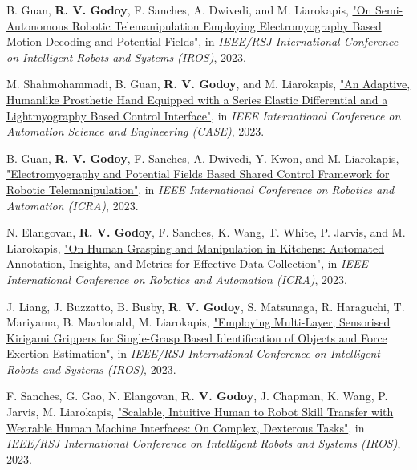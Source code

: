 \begin{cvparagraph}
B. Guan, \textbf{R. V. Godoy}, F. Sanches, A. Dwivedi, and M. Liarokapis, \href{https://www.researchgate.net/publication/372788367_On_Semi-Autonomous_Robotic_Telemanipulation_Employing_Electromyography_Based_Motion_Decoding_and_Potential_Fields}{"On Semi-Autonomous Robotic Telemanipulation Employing Electromyography Based Motion Decoding and Potential Fields"}, in \textit{IEEE/RSJ International Conference on Intelligent Robots and Systems (IROS)}, 2023.

M. Shahmohammadi, B. Guan, \textbf{R. V. Godoy}, and M. Liarokapis, \href{https://ieeexplore.ieee.org/document/10260643}{"An Adaptive, Humanlike Prosthetic Hand Equipped with a Series Elastic Differential and a Lightmyography Based Control Interface"}, in \textit{IEEE International Conference on Automation Science and Engineering (CASE)}, 2023.

B. Guan, \textbf{R. V. Godoy}, F. Sanches, A. Dwivedi, Y. Kwon, and M. Liarokapis, \href{https://www.researchgate.net/publication/370205435_Electromyography_and_Potential_Fields_Based_Shared_Control_Framework_for_Robotic_Telemanipulation}{"Electromyography and Potential Fields Based Shared Control Framework for Robotic Telemanipulation"}, in \textit{IEEE International Conference on Robotics and Automation (ICRA)}, 2023.

N. Elangovan, \textbf{R. V. Godoy}, F. Sanches, K. Wang, T. White, P. Jarvis, and M. Liarokapis, \href{https://ieeexplore.ieee.org/document/10161171}{"On Human Grasping and Manipulation in Kitchens: Automated Annotation, Insights, and Metrics for Effective Data Collection"}, in \textit{IEEE International Conference on Robotics and Automation (ICRA)}, 2023.

J. Liang, J. Buzzatto, B. Busby, \textbf{R. V. Godoy}, S. Matsunaga, R. Haraguchi, T. Mariyama, B. Macdonald, M. Liarokapis, \href{https://www.researchgate.net/publication/374086867_Employing_Multi-Layer_Sensorised_Kirigami_Grippers_for_Single-Grasp_Based_Identification_of_Objects_and_Force_Exertion_Estimation?_tp=eyJjb250ZXh0Ijp7ImZpcnN0UGFnZSI6InByb2ZpbGUiLCJwYWdlIjoicHJvZmlsZSJ9fQ}{"Employing Multi-Layer, Sensorised Kirigami Grippers for Single-Grasp Based Identification of Objects and Force Exertion Estimation"}, in \textit{IEEE/RSJ International Conference on Intelligent Robots and Systems (IROS)}, 2023. 

F. Sanches, G. Gao, N. Elangovan, \textbf{R. V. Godoy}, J. Chapman, K. Wang, P. Jarvis, M. Liarokapis, \href{https://www.researchgate.net/publication/372861764_Scalable_Intuitive_Human_to_Robot_Skill_Transfer_with_Wearable_Human_Machine_Interfaces_On_Complex_Dexterous_Tasks}{"Scalable, Intuitive Human to Robot Skill Transfer with Wearable Human Machine Interfaces: On Complex, Dexterous Tasks"}, in \textit{IEEE/RSJ International Conference on Intelligent Robots and Systems (IROS)}, 2023.


\end{cvparagraph}
